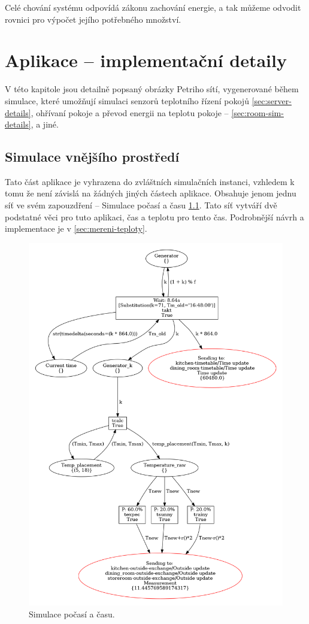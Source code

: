 Celé chování systému odpovídá zákonu zachování energie, a tak můžeme odvodit rovnici pro výpočet jejího potřebného množství.

\chapter{Aplikace -- implementační detaily}
\label{chap:app-implementation}

V této kapitole jsou detailně popsaný obrázky Petriho sítí, vygenerované během simulace, které umožňují simulaci senzorů teplotního řízení pokojů \ref{sec:server-details}, ohřívaní pokoje a převod energii na teplotu pokoje -- \ref{sec:room-sim-details}, a jiné.

\section{Simulace vnějšího prostředí}
Tato část aplikace je vyhrazena do zvláštních simulačních instanci, vzhledem k tomu že není závislá na žádných jiných částech aplikace. Obsahuje jenom jednu síť ve svém zapouzdření -- Simulace počasí a času \ref{weather-viz}. Tato síť vytváří dvě podstatné věci pro tuto aplikaci, čas a teplotu pro tento čas. Podrobnější návrh a implementace je v \ref{sec:mereni-teploty}.

\begin{figure}[htb]
 \centering
 \includegraphics[width=\textwidth]{obrazky-figures/weather-sim.png}
 \caption{Simulace počasí a času.}
 \label{weather-viz}
\end{figure}

